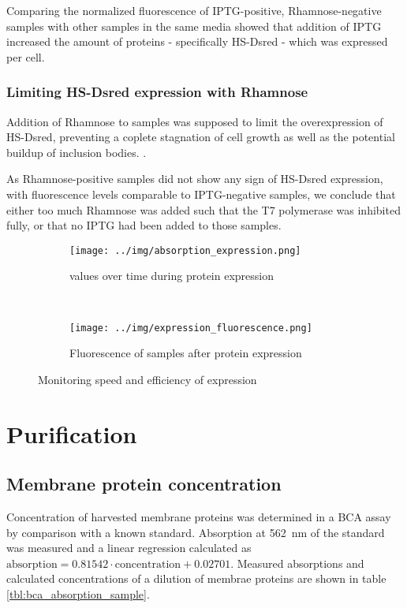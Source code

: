 Comparing the normalized fluorescence of IPTG-positive, Rhamnose-negative
samples with other samples in the same media showed that addition of IPTG
increased the amount of proteins - specifically HS-Dsred - which was expressed
per cell.

\subsubsection{Limiting HS-Dsred expression with Rhamnose}

Addition of Rhamnose to samples was supposed to limit the overexpression of
HS-Dsred, preventing a coplete stagnation of cell growth as well as the
potential buildup of inclusion bodies. \cite{memstar}.

As Rhamnose-positive samples did not show any sign of HS-Dsred expression, with
fluorescence levels comparable to IPTG-negative samples, we conclude that
either too much Rhamnose was added such that the T7 polymerase was inhibited
fully, or that no IPTG had been added to those samples.


\begin{figure}
	\centering
	\begin{subfigure}{0.45\textwidth}
		\texttt{[image: ../img/absorption\_expression.png]}
		\caption{\odbact values over time during protein expression}
		\label{fig:absorption_expression}
	\end{subfigure}
	~
	\begin{subfigure}{0.45\textwidth}
		\centering
		\texttt{[image: ../img/expression\_fluorescence.png]}
		\caption{Fluorescence of samples after protein expression}
		\label{fig:fluorescence_expression}
	\end{subfigure}

	\caption{Monitoring speed and efficiency of expression}
	\label{fig:expression}
\end{figure}

\section{Purification}

\subsection{Membrane protein concentration}

Concentration of harvested membrane proteins was determined in a BCA assay by
comparison with a known standard. Absorption at \SI{562}{\nm} of the standard
was measured and a linear regression calculated as $\text{absorption} = 0.81542
\cdot \text{concentration} + 0.02701$. Measured absorptions and calculated
concentrations of a dilution of membrae proteins are shown in table
\ref{tbl:bca_absorption_sample}.

